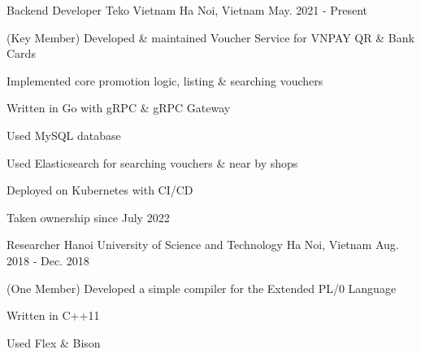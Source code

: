 \begin{cventries}
\cventry
{Backend Developer} %
{Teko Vietnam} %
{Ha Noi, Vietnam} %
{May. 2021 - Present} %
{ %
\begin{cvitems}
\item{(Key Member) Developed \& maintained Voucher Service for VNPAY QR \& Bank Cards}
\item{Implemented core promotion logic, listing \& searching vouchers}
\item{Written in Go with gRPC \& gRPC Gateway}
\item{Used MySQL database}
\item{Used Elasticsearch for searching vouchers \& near by shops}
\item{Deployed on Kubernetes with CI/CD}
\item{Taken ownership since July 2022}
\end{cvitems}
}


\cventry
{Researcher} %
{Hanoi University of Science and Technology} %
{Ha Noi, Vietnam} %
{Aug. 2018 - Dec. 2018} %
{ %
\begin{cvitems}
\item{(One Member) Developed a simple compiler for the Extended PL/0 Language}
\item{Written in C++11}
\item{Used Flex \& Bison}
\end{cvitems}
}


\end{cventries}
